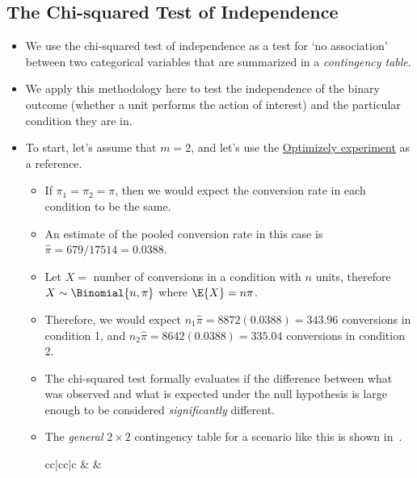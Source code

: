 \subsection{The Chi-squared Test of Independence}
\begin{itemize}
      \item We use the chi-squared test of independence as a test for `no association'
            between two categorical variables that are summarized in a \emph{contingency table}.
      \item We apply this methodology here to test the independence of the binary outcome
            (whether a unit performs the action of interest) and the particular condition they are in.
      \item To start, let's assume that $ m=2 $, and let's use the \hyperref[ex:optimizely_ex1]{Optimizely experiment} as a reference.
            \begin{itemize}
                  \item If $ \pi_1=\pi_2=\pi $, then we would expect the conversion rate in each condition to be the same.
                  \item An estimate of the pooled conversion rate in this case is $ \hat{\pi}=679/17514=0.0388 $.
                  \item Let $ X= $ number of conversions in a condition with $ n $ units, therefore $ X \sim \Binomial{n,\pi} $
                        where $ \E{X}=n\pi $.
                  \item Therefore, we would expect $ n_1\hat{\pi}=8872(0.0388)=343.96 $ conversions in condition 1,
                        and $ n_2\hat{\pi}=8642(0.0388)=335.04 $ conversions in condition 2.
                  \item The chi-squared test formally evaluates if the difference between what
                        was observed and what is expected under the null hypothesis is large enough
                        to be considered \emph{significantly} different.
                  \item The \emph{general} $ 2\times 2 $ contingency table for a scenario like this
                        is shown in~.
                        \begin{table}[!htbp]
                              \centering
                              \caption{A General $ 2\times 2 $ Contingency Table}\label{general_22_contingency}
                              \begin{NiceTabular}{cc|cc|c}
                                            &  &                                                                                       \\

\end{NiceTabular}
\end{table}
\end{itemize}
\end{itemize}

